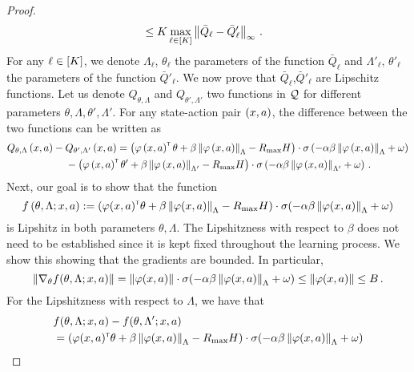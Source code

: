 \begin{proof}
\begin{align*}
        &\leq K \max_{\ell \in [K]} \left\| \bar{Q}_\ell - \bar{Q}'_\ell \right\|_{\infty}\,.
    \end{align*}
    For any $\ell \in \left[ K \right]$, we denote $\Lambda_\ell$, $\theta_\ell$ the parameters of the function $\bar{Q}_\ell$ and $\Lambda'_\ell$, $\theta'_\ell$ the parameters of the function $\bar{Q}'_\ell$. We now prove that $\bar{Q}_\ell$,$\bar{Q}'_\ell$ are Lipschitz functions. Let us denote $Q_{\theta, \Lambda}$ and $Q_{\theta', \Lambda'}$ two functions in $\mathcal{Q}$ for different parameters $\theta, \Lambda, \theta', \Lambda'$. For any state-action pair $\left( x, a \right)$, the difference between the two functions can be written as
    \begin{align*}
        &Q_{\theta, \Lambda} \left( x, a \right) - Q_{\theta', \Lambda'} \left( x, a \right) = \left( \varphi \left( x, a \right)^\mathsf{\scriptscriptstyle T} \theta + \beta \left\|\varphi \left( x, a \right)\right\|_\Lambda - R_{\max} H \right) \cdot \sigma \left( - \alpha \beta \left\|\varphi \left( x, a \right)\right\|_\Lambda + \omega \right) \\
        &\phantom{=}\quad\quad\quad\quad\quad- \left( \varphi \left( x, a \right)^\mathsf{\scriptscriptstyle T} \theta' + \beta \left\|\varphi \left( x, a \right)\right\|_{\Lambda'} - R_{\max} H \right) \cdot \sigma \left( - \alpha \beta \left\|\varphi \left( x, a \right)\right\|_{\Lambda'} + \omega \right)\,.
    \end{align*}
    Next, our goal is to show that the function
    \begin{equation*}
        f \left( \theta, \Lambda; x, a \right) := \left( \varphi(x,a)^\mathsf{\scriptscriptstyle T} \theta + \beta \left\|\varphi (x, a)\right\|_{\Lambda} - R_{\max} H \right) \cdot \sigma(- \alpha\beta \left\|\varphi(x,a)\right\|_{\Lambda} + \omega)
    \end{equation*}
    is Lipshitz in both parameters $\theta, \Lambda$. The Lipshitzness with respect to $\beta$ does not need to be established since it is kept fixed throughout the learning process. We show this showing that the gradients are bounded. In particular,
    \begin{equation*}
        \left\|\nabla_\theta f(\theta,\Lambda;x,a)\right\| = \left\|\varphi(x,a)\right\| \cdot \sigma(- \alpha\beta \left\|\varphi(x,a)\right\|_{\Lambda} + \omega) \leq \left\|\varphi(x,a)\right\|  \leq B\,.
    \end{equation*}
    For the Lipshitzness with respect to $\Lambda$, we have that
    \begin{align*}
        &f(\theta,\Lambda;x,a) - f(\theta,\Lambda';x,a) \\
        &= \spr{\phi(x,a)\transpose \theta + \beta \norm{\phi(x,a)}_{\Lambda} 
        - \RMAX H}\cdot \sigma(- \alpha\beta \norm{\phi(x,a)}_{\Lambda} + \omega) \\

\end{align*}
\end{proof}
